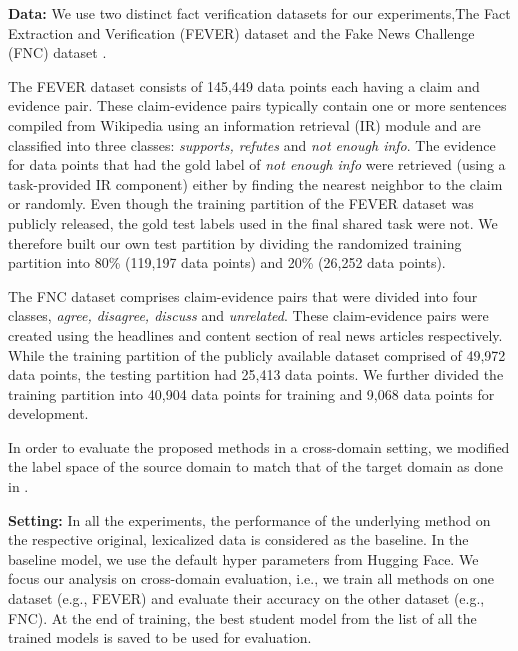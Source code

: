 \textbf{Data:} We use two distinct fact verification datasets for
our experiments,The Fact Extraction and Verification (FEVER) dataset  \citep{thorne-etal-2018-fact} and the Fake News Challenge (FNC) dataset \citep{pomerleau2017fake}.

The FEVER dataset consists of 145,449 data points each having a claim and evidence pair. These claim-evidence pairs typically contain one or more sentences compiled from Wikipedia using an information retrieval (IR) module and are classified into three classes: \textit{supports, refutes} and \textit{not enough info}. The evidence for data points that had the gold label of \textit{not enough info} were  retrieved (using a task-provided IR component) either by finding the nearest neighbor to the claim or randomly. Even though the training partition of the FEVER dataset was publicly released, the gold test labels used in the final shared task were not. We therefore built our own test partition by dividing the randomized training partition into 80\% (119,197 data points) and 20\% (26,252 data points).

The FNC dataset comprises claim-evidence pairs that were divided into four classes, \textit{agree, disagree, discuss} and \textit{unrelated}. These claim-evidence pairs were created using the headlines and content section of real news articles respectively. While the training partition of the publicly available dataset comprised of 49,972 data points, the testing partition had 25,413 data points. We further divided the training partition into
40,904 data points for training and 9,068 data points for development.

In order to evaluate the proposed methods in a cross-domain setting, we modified the label space of the source domain to match that of the target domain as done in \cite{suntwal-etal-2019-importance}.


\textbf{Setting:} In all the experiments, the performance of the underlying method on the respective original, lexicalized data is considered as the baseline. In the baseline model, we use the default hyper parameters from Hugging Face. 
We focus our analysis on cross-domain evaluation, i.e., we train all methods on one dataset  (e.g., FEVER) and evaluate their accuracy on the other dataset (e.g., FNC). At the end of training, the best student model from the list of all the trained models is saved to be used for evaluation.



